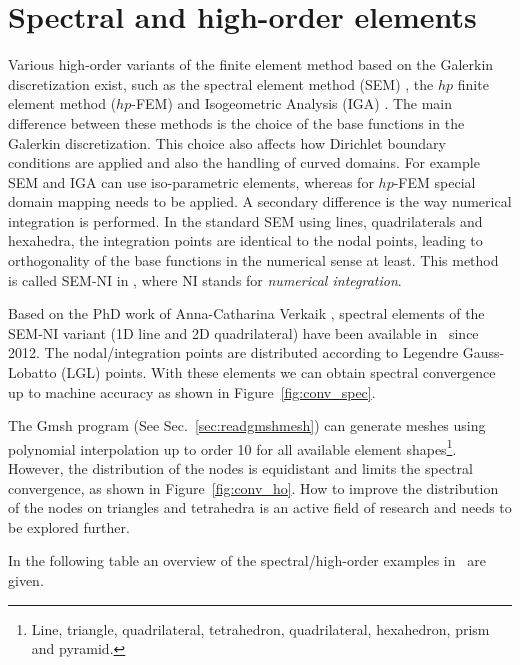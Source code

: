 
\def\headdate{16th July 2021}

\section{Spectral and high-order elements}
\label{sec:highorder}

Various high-order variants of the finite element method based on the Galerkin discretization exist, such as 
the spectral element method (SEM) \cite{canuto_spectral_2007}, the $hp$ finite element method ($hp$-FEM) \cite{szabo_finite_1991} and Isogeometric Analysis (IGA) \cite{cottrell_isogeometric_2009}. The main
difference between these methods is the choice of the base functions in the Galerkin discretization. This choice also affects how Dirichlet boundary conditions are applied and also the handling of curved domains. For example SEM and IGA can use iso-parametric elements, whereas for $hp$-FEM special domain mapping needs to be applied. A secondary difference is the way numerical integration is performed. In the standard SEM using lines, quadrilaterals and hexahedra, the integration points are identical to the nodal points, leading to orthogonality of the base functions in the numerical sense at least. This method is called SEM-NI in \cite{canuto_spectral_2007}, where NI stands for \emph{numerical integration}.

Based on the PhD work of Anna-Catharina Verkaik \cite{verkaik_overlapping_2014,verkaik_coupling_2015}, spectral elements of the SEM-NI variant (1D line and 2D quadrilateral) have been available in \tfem\ since 2012. The nodal/integration points are distributed according to Legendre Gauss-Lobatto (LGL) points. With these elements we can obtain spectral convergence up to machine accuracy as shown in Figure~\ref{fig:conv_spec}.

The Gmsh program (See Sec.~\ref{sec:readgmshmesh}) can generate meshes using polynomial interpolation up to order 10 for all available element shapes\footnote{Line, triangle, quadrilateral, tetrahedron, quadrilateral, hexahedron, prism and pyramid.}. However, the distribution of the nodes is equidistant and limits the spectral convergence, as shown in Figure~\ref{fig:conv_ho}. How to improve the distribution of the nodes on triangles and tetrahedra is an active field of research \cite{warburton_explicit_2007} and needs to be explored further.

In the following table an overview of the spectral/high-order examples in \tfem\ are given.\medskip

